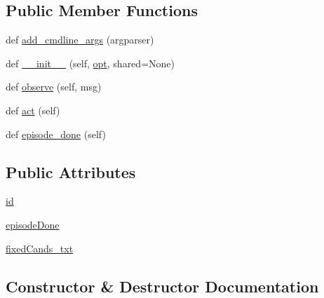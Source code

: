 \subsection*{Public Member Functions}
\begin{DoxyCompactItemize}
\item 
def \hyperlink{classparlai_1_1agents_1_1local__human_1_1local__human_1_1LocalHumanAgent_abc9993870cbd73a7706abef20021d6ca}{add\+\_\+cmdline\+\_\+args} (argparser)
\item 
def \hyperlink{classparlai_1_1agents_1_1local__human_1_1local__human_1_1LocalHumanAgent_ae6f3a4687b2a0c78d55f43bd89960fb0}{\+\_\+\+\_\+init\+\_\+\+\_\+} (self, \hyperlink{classparlai_1_1core_1_1agents_1_1Agent_ab3b45d2754244608c75d4068b90cd051}{opt}, shared=None)
\item 
def \hyperlink{classparlai_1_1agents_1_1local__human_1_1local__human_1_1LocalHumanAgent_aa204d28672d6580895d95aed167cb129}{observe} (self, msg)
\item 
def \hyperlink{classparlai_1_1agents_1_1local__human_1_1local__human_1_1LocalHumanAgent_a8959f66f1f70152c13552f99f5b10067}{act} (self)
\item 
def \hyperlink{classparlai_1_1agents_1_1local__human_1_1local__human_1_1LocalHumanAgent_a5c598c26dfd30db3120dac0cf02daf67}{episode\+\_\+done} (self)
\end{DoxyCompactItemize}
\subsection*{Public Attributes}
\begin{DoxyCompactItemize}
\item 
\hyperlink{classparlai_1_1agents_1_1local__human_1_1local__human_1_1LocalHumanAgent_a3b48630b9efada11b53cf37cbf269cce}{id}
\item 
\hyperlink{classparlai_1_1agents_1_1local__human_1_1local__human_1_1LocalHumanAgent_abbcf0b2948c89b6c42a10ef1c81457ce}{episode\+Done}
\item 
\hyperlink{classparlai_1_1agents_1_1local__human_1_1local__human_1_1LocalHumanAgent_a25f1a4e682f5cdbd61b211b1c9d5cf44}{fixed\+Cands\+\_\+txt}
\end{DoxyCompactItemize}


\subsection{Constructor \& Destructor Documentation}
\mbox{\label{classparlai_1_1agents_1_1local__human_1_1local__human_1_1LocalHumanAgent_ae6f3a4687b2a0c78d55f43bd89960fb0}} 
